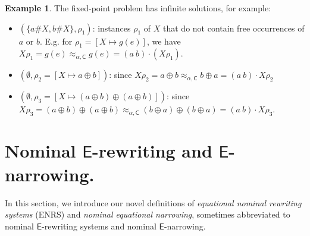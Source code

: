 \documentclass[11pt,a4paper]{amsart}
\newcommand{\aleq}{\approx_{\alpha}}
\newcommand{\caleq}{\approx_{\alpha,\theory{C}}}
\newcommand{\alert}[1]{\textcolor{red}{#1}}
\newcommand{\theory}[1]{\ensuremath{\mathsf{#1}}}
\theoremstyle{plain}
\theoremstyle{definition}
\newtheorem{example}{Example}[section]
\theoremstyle{remark}
\begin{document}
\begin{example}
The fixed-point problem has infinite solutions, for example:
\begin{itemize}
    \item $(\{a\#X,b\#X\}, \rho_1)$: instances $\rho_1$ of $X$ that do not contain free occurrences of $a$ or $b$. E.g. for $\rho_1=[X\mapsto g(e)]$, we have  $X\rho_1=g(e) \caleq g(e)= (a\ b) \cdot (X\rho_1) $.
     \item $(\emptyset, \rho_2 
= [X\mapsto a \oplus b])$: since $X\rho_2 = a\oplus b \caleq b \oplus a = (a\ b)\cdot X\rho_2$
    \item $(\emptyset, \rho_3 
= [X\mapsto (a \oplus b)\oplus(a \oplus b)])$: since
$X\rho_3 = (a \oplus b)\oplus(a \oplus b) \caleq (b \oplus a)\oplus(b \oplus a) = (a\ b)\cdot X\rho_3.$ 
\end{itemize}
\end{example}


\section{Nominal \theory{E}-rewriting and \theory{E}-narrowing.} \label{sec:e-rewriting}

In this section, we introduce our novel definitions of {\em equational nominal rewriting systems} (ENRS) and {\em nominal equational narrowing}, sometimes abbreviated to nominal \theory{E}-rewriting systems and nominal \theory{E}-narrowing.
\end{document}
